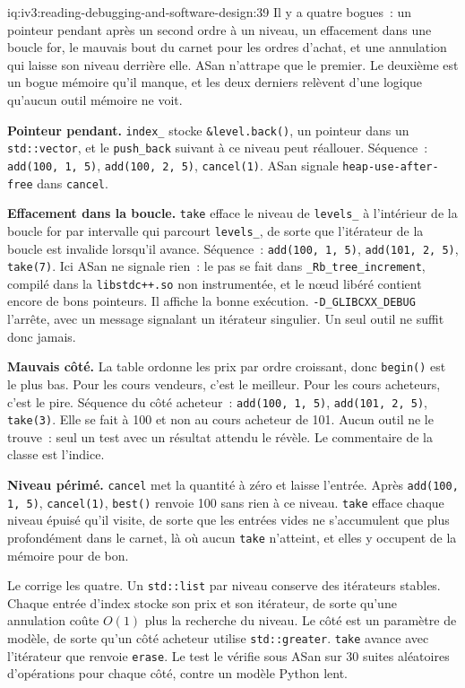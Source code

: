 \begin{solution}{iq:iv3:reading-debugging-and-software-design:39}
Il y a quatre bogues~: un pointeur pendant après un second ordre à un niveau, un effacement dans une boucle for, le mauvais bout du carnet pour les ordres d'achat, et une annulation qui laisse son niveau derrière elle. ASan n'attrape que le premier. Le deuxième est un bogue mémoire qu'il manque, et les deux derniers relèvent d'une logique qu'aucun outil mémoire ne voit.

\textbf{Pointeur pendant.} \texttt{index\_} stocke \texttt{\&level.back()}, un pointeur dans un \texttt{std::vector}, et le \texttt{push\_back} suivant à ce niveau peut réallouer. Séquence~: \texttt{add(100, 1, 5)}, \texttt{add(100, 2, 5)}, \texttt{cancel(1)}. ASan signale \texttt{heap-use-after-free} dans \texttt{cancel}.

\textbf{Effacement dans la boucle.} \texttt{take} efface le niveau de \texttt{levels\_} à l'intérieur de la boucle for par intervalle qui parcourt \texttt{levels\_}, de sorte que l'itérateur de la boucle est invalide lorsqu'il avance. Séquence~: \texttt{add(100, 1, 5)}, \texttt{add(101, 2, 5)}, \texttt{take(7)}. Ici ASan ne signale rien~: le pas se fait dans \texttt{\_Rb\_tree\_increment}, compilé dans la \texttt{libstdc++.so} non instrumentée, et le nœud libéré contient encore de bons pointeurs. Il affiche la bonne exécution. \texttt{-D\_GLIBCXX\_DEBUG} l'arrête, avec un message signalant un itérateur singulier. Un seul outil ne suffit donc jamais.

\textbf{Mauvais côté.} La table ordonne les prix par ordre croissant, donc \texttt{begin()} est le plus bas. Pour les cours vendeurs, c'est le meilleur. Pour les cours acheteurs, c'est le pire. Séquence du côté acheteur~: \texttt{add(100, 1, 5)}, \texttt{add(101, 2, 5)}, \texttt{take(3)}. Elle se fait à 100 et non au cours acheteur de 101. Aucun outil ne le trouve~: seul un test avec un résultat attendu le révèle. Le commentaire de la classe est l'indice.

\textbf{Niveau périmé.} \texttt{cancel} met la quantité à zéro et laisse l'entrée. Après \texttt{add(100, 1, 5)}, \texttt{cancel(1)}, \texttt{best()} renvoie 100 sans rien à ce niveau. \texttt{take} efface chaque niveau épuisé qu'il visite, de sorte que les entrées vides ne s'accumulent que plus profondément dans le carnet, là où aucun \texttt{take} n'atteint, et elles y occupent de la mémoire pour de bon.

Le  corrige les quatre. Un \texttt{std::list} par niveau conserve des itérateurs stables. Chaque entrée d'index stocke son prix et son itérateur, de sorte qu'une annulation coûte $O(1)$ plus la recherche du niveau. Le côté est un paramètre de modèle, de sorte qu'un côté acheteur utilise \texttt{std::greater}. \texttt{take} avance avec l'itérateur que renvoie \texttt{erase}. Le test le vérifie sous ASan sur 30 suites aléatoires d'opérations pour chaque côté, contre un modèle Python lent.


\end{solution}
